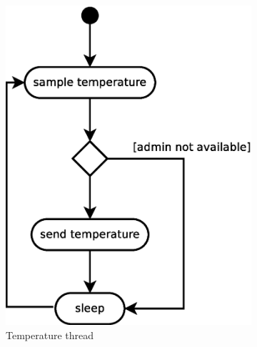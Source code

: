 \begin{figure}[ht!]
\centering
    \begin{subfigure}[b]{0.3\textwidth}
        \includegraphics[scale=0.35]{eps/temp_th}
        \caption{Temperature thread}
        \label{fig:tempthread}
    \end{subfigure}
    \begin{subfigure}[b]{0.3\textwidth}

\end{subfigure}
\end{figure}
